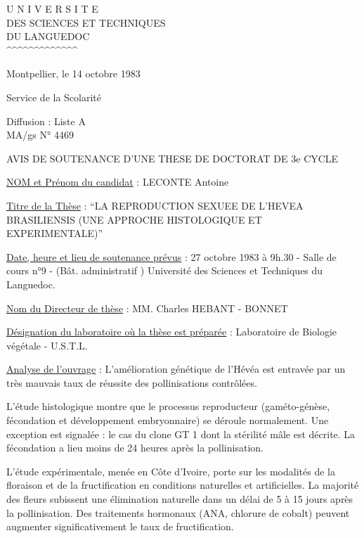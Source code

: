 
\begin{center}
U N I V E R S I T E\\
DES SCIENCES ET TECHNIQUES\\
DU LANGUEDOC\\
\textasciicircum\textasciicircum\textasciicircum\textasciicircum\textasciicircum\textasciicircum\textasciicircum\textasciicircum\textasciicircum\textasciicircum\textasciicircum\textasciicircum\textasciicircum
\end{center}

Montpellier, le 14 octobre 1983

Service de la Scolarité

Diffusion : Liste A\\
MA/gs \hfill N° 4469

\begin{center}
AVIS DE SOUTENANCE D'UNE THESE DE DOCTORAT DE 3e CYCLE

\end{center}

\uline{NOM et Prénom du candidat} : LECONTE Antoine

\uline{Titre de la Thèse} : ``LA REPRODUCTION SEXUEE DE L'HEVEA BRASILIENSIS (UNE APPROCHE HISTOLOGIQUE ET EXPERIMENTALE)''

\uline{Date, heure et lieu de soutenance prévus} : 27 octobre 1983 à 9h.30 - Salle de cours n°9 - (Bât. administratif ) Université des Sciences et Techniques du Languedoc.

\uline{Nom du Directeur de thèse} : MM. Charles HEBANT - BONNET

\uline{Désignation du laboratoire où la thèse est préparée} : Laboratoire de Biologie végétale - U.S.T.L.

\uline{Analyse de l'ouvrage} : L'amélioration génétique de l'Hévéa est entravée par un très mauvais taux de réussite des pollinisations contrôlées.

L'étude histologique montre que le processus reproducteur (gaméto-génèse, fécondation et développement embryonnaire) se déroule normalement. Une exception est signalée : le cas du clone GT 1 dont la stérilité mâle est décrite. La fécondation a lieu moins de 24 heures après la pollinisation.

L'étude expérimentale, menée en Côte d'Ivoire, porte sur les modalités de la floraison et de la fructification en conditions naturelles et artificielles. La majorité des fleurs subissent une élimination naturelle dans un délai de 5 à 15 jours après la pollinisation. Des traitements hormonaux (ANA, chlorure de cobalt) peuvent augmenter significativement le taux de fructification.

